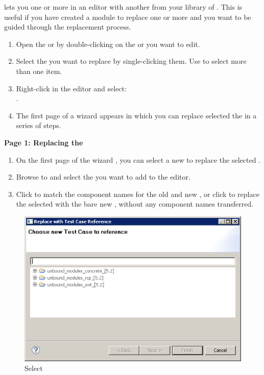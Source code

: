 
\app{} lets you  one or more \gdcases{} in an editor with another \gdcase{} from your library of \gdcases{}. This is useful if you have created a module to replace one or more \gdcases{} and you want to be guided through the replacement process.


\begin{enumerate}
\item Open the \gdtestcaseeditor{} or \gdtestsuiteeditor{} by double-clicking on the \gdcase{} or \gdsuite{} you  want to edit. 
\item Select the \gdcases{} you want to replace by single-clicking them. Use 
   to select more than one item. 
\item Right-click in the editor and  select: \\
.
\item The first page of a wizard appears in which you can replace selected the \gdcases{} in a series of steps. 
\end{enumerate}



\textbf{Page 1: Replacing the \gdcases{}}
\begin{enumerate}
\item On the first page of the wizard , you can select a  new  \gdcase{} to replace the selected \gdcases{}. 
\item Browse to and select the \gdcase{} you want to add to the editor.
\item Click  to match the component names for the old and new \gdcases{}, or click  to replace the selected \gdcases{} with the bare new \gdcase{}, without any component names transferred. 
\end{enumerate}

\begin{figure}[h]
\begin{center}
\includegraphics[width=12.5cm]{Tasks/Editors/PS/ReplaceTC_ChooseTC}
\caption{Select \gdcase{}}
\label{ReplaceTC-ChooseTC}
\end{center}
\end{figure} 


